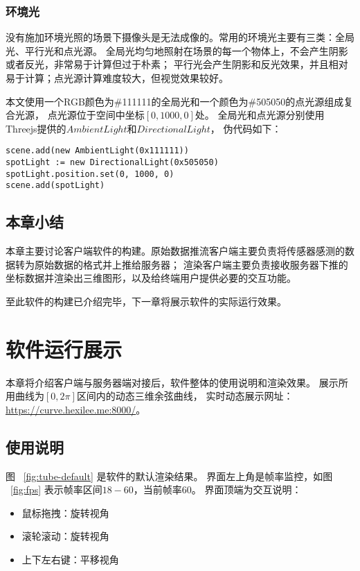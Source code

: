 \subsubsection{环境光}

没有施加环境光照的场景下摄像头是无法成像的。常用的环境光主要有三类：全局光、平行光和点光源。
全局光均匀地照射在场景的每一个物体上，不会产生阴影或者反光，非常易于计算但过于朴素；
平行光会产生阴影和反光效果，并且相对易于计算；点光源计算难度较大，但视觉效果较好。

本文使用一个RGB颜色为\#111111的全局光和一个颜色为\#505050的点光源组成复合光源，
点光源位于空间中坐标$[0, 1000, 0]$处。
全局光和点光源分别使用Threejs提供的$AmbientLight$和$DirectionalLight$，
伪代码如下：

\begin{lstlisting}[caption={环境光}]
scene.add(new AmbientLight(0x111111))
spotLight := new DirectionalLight(0x505050)
spotLight.position.set(0, 1000, 0)
scene.add(spotLight)
\end{lstlisting}

\subsection{本章小结}
本章主要讨论客户端软件的构建。原始数据推流客户端主要负责将传感器感测的数据转为原始数据的格式并上推给服务器；
渲染客户端主要负责接收服务器下推的坐标数据并渲染出三维图形，以及给终端用户提供必要的交互功能。

至此软件的构建已介绍完毕，下一章将展示软件的实际运行效果。

\clearpage

\section{软件运行展示}
\label{sec:pre}
本章将介绍客户端与服务器端对接后，软件整体的使用说明和渲染效果。
展示所用曲线为$[0, 2\pi]$区间内的动态三维余弦曲线，
实时动态展示网址：\href{https://curve.hexilee.me:8000/}{https://curve.hexilee.me:8000/}。

\subsection{使用说明}
\FloatBarrier

图 ~\ref{fig:tube-default} 是软件的默认渲染结果。
界面左上角是帧率监控，如图 ~\ref{fig:fps} 表示帧率区间$18-60$，当前帧率$60$。
界面顶端为交互说明：

\begin{itemize}
\item 鼠标拖拽：旋转视角
\item 滚轮滚动：旋转视角
\item 上下左右键：平移视角
\end{itemize}

